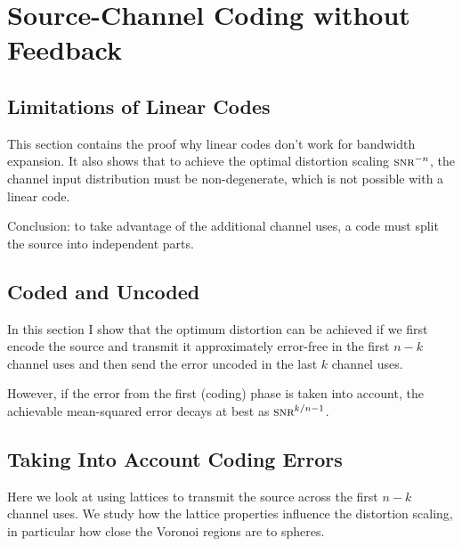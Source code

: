 \chapter{Source-Channel Coding without Feedback}

\section{Limitations of Linear Codes}

This section contains the proof why linear codes don't work for bandwidth
expansion. It also shows that to achieve the optimal distortion scaling
$\snr^{-n}$, the channel input distribution must be non-degenerate, which is not
possible with a linear code. 

Conclusion: to take advantage of the additional channel uses, a code must split
the source into independent parts. 


\section{Coded and Uncoded}

In this section I show that the optimum distortion can be achieved if we first
encode the source and transmit it approximately error-free in the first $n-k$
channel uses and then send the error uncoded in the last $k$ channel uses.

However, if the error from the first (coding) phase is taken into account, the
achievable mean-squared error decays at best as $\snr^{k/n-1}$. 


\section{Taking Into Account Coding Errors}

Here we look at using lattices to transmit the source across the first $n-k$
channel uses. We study how the lattice properties influence the distortion
scaling, in particular how close the Voronoi regions are to spheres. 
